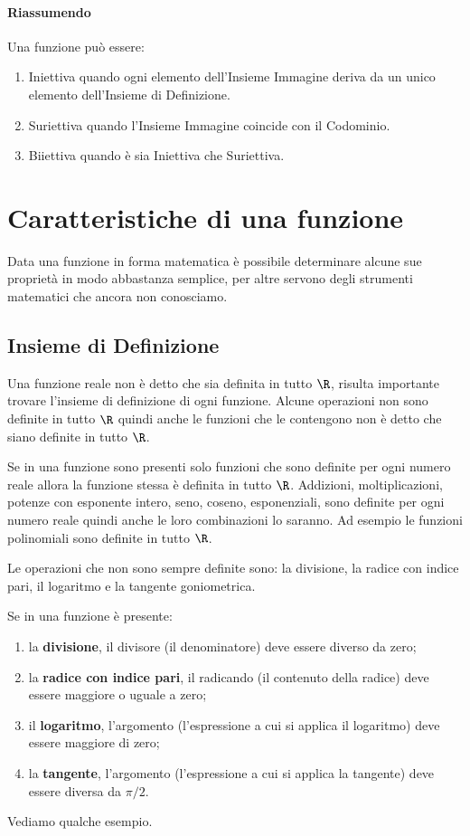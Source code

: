\paragraph{Riassumendo}

Una funzione può essere:
\begin{enumerate} [nosep]
\item Iniettiva quando ogni elemento dell'Insieme Immagine deriva da un unico 
elemento dell'Insieme di Definizione.
\item Suriettiva quando l'Insieme Immagine coincide con il Codominio.
\item Biiettiva quando è sia Iniettiva che Suriettiva.
\end{enumerate}

\section{Caratteristiche di una funzione}
\label{sec:funzioni2_caratteristiche}

Data una funzione in forma matematica è possibile determinare alcune sue 
proprietà in modo abbastanza semplice, per altre servono degli strumenti 
matematici che ancora non conosciamo.

\subsection{Insieme di Definizione}

Una funzione reale non è detto che sia definita in tutto \(\R\), risulta 
importante trovare l'insieme di definizione di ogni funzione.
Alcune operazioni non sono definite in tutto \(\R\) quindi anche le funzioni 
che le contengono non è detto che siano definite in tutto \(\R\). 

Se in una funzione sono presenti solo funzioni che sono definite per ogni 
numero reale allora la funzione stessa è definita in tutto \(\R\). 
Addizioni, moltiplicazioni, potenze con esponente intero, seno, coseno, 
esponenziali, sono definite per ogni numero reale quindi anche le loro 
combinazioni lo saranno.
Ad esempio le funzioni polinomiali sono definite in tutto \(\R\). 

Le operazioni che non sono sempre definite sono: \quad 
la divisione, la radice con indice pari, il logaritmo e la tangente 
goniometrica.

Se in una funzione è presente:
\begin{enumerate} [noitemsep]
\item la \textbf{divisione}, il divisore (il denominatore) deve essere diverso 
da zero;
\item la \textbf{radice con indice pari}, il radicando (il contenuto della 
radice) deve essere maggiore o uguale a zero;
\item il \textbf{logaritmo}, l'argomento (l'espressione a cui si applica il 
logaritmo) deve essere maggiore di zero;
\item la \textbf{tangente}, l'argomento (l'espressione a cui si applica la 
tangente) deve essere diversa da \(\pi/2\).
\end{enumerate}
Vediamo qualche esempio.

